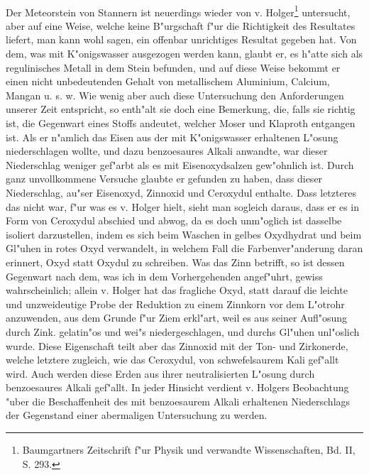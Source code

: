 \documentclass[a4paper, 11pt, oneside]{article}
\begin{document}
\paragraph{}
Der Meteorstein von Stannern ist neuerdings wieder von v. Holger\footnote{Baumgartners Zeitschrift f"ur Physik und verwandte Wissenschaften, Bd. II, S. 293.} untersucht, aber auf eine Weise, welche keine B"urgschaft f"ur die Richtigkeit des Resultates liefert, man kann wohl sagen, ein offenbar unrichtiges Resultat gegeben hat. Von dem, was mit K"onigswasser ausgezogen werden kann, glaubt er, es h"atte sich als regulinisches Metall in dem Stein befunden, und auf diese Weise bekommt er einen nicht unbedeutenden Gehalt von metallischem Aluminium, Calcium, Mangan u. s. w. Wie wenig aber auch diese Untersuchung den Anforderungen unserer Zeit entspricht, so enth"alt sie doch eine Bemerkung, die, falls sie richtig ist, die Gegenwart eines Stoffs andeutet, welcher Moser und Klaproth entgangen ist. Als er n"amlich das Eisen aus der mit K"onigswasser erhaltenen L"osung niederschlagen wollte, und dazu benzoesaures Alkali anwandte, war dieser Niederschlag weniger gef"arbt als es mit Eisenoxydsalzen gew"ohnlich ist. Durch ganz unvollkommene Versuche glaubte er gefunden zu haben, dass dieser Niederschlag, au"ser Eisenoxyd, Zinnoxid und Ceroxydul enthalte. Dass letzteres das nicht war, f"ur was es v. Holger hielt, sieht man sogleich daraus, dass er es in Form von Ceroxydul abschied und abwog, da es doch unm"oglich ist dasselbe isoliert darzustellen, indem es sich beim Waschen in gelbes Oxydhydrat und beim Gl"uhen in rotes Oxyd verwandelt, in welchem Fall die Farbenver"anderung daran erinnert, Oxyd statt Oxydul zu schreiben. Was das Zinn betrifft, so ist dessen Gegenwart nach dem, was ich in dem Vorhergehenden angef"uhrt, gewiss wahrscheinlich; allein v. Holger hat das fragliche Oxyd, statt darauf die leichte und unzweideutige Probe der Reduktion zu einem Zinnkorn vor dem L"otrohr anzuwenden, aus dem Grunde f"ur Ziem erkl"art, weil es aus seiner Aufl"osung durch Zink. gelatin"os und wei"s niedergeschlagen, und durchs Gl"uhen unl"oslich wurde. Diese Eigenschaft teilt aber das Zinnoxid mit der Ton- und Zirkonerde, welche letztere zugleich, wie das Ceroxydul, von schwefelsaurem Kali gef"allt wird. Auch werden diese Erden aus ihrer neutralisierten L"osung durch benzoesaures Alkali gef"allt. In jeder Hinsicht verdient v. Holgers Beobachtung "uber die Beschaffenheit des mit benzoesaurem Alkali erhaltenen Niederschlags der Gegenstand einer abermaligen Untersuchung zu werden.
\end{document}
